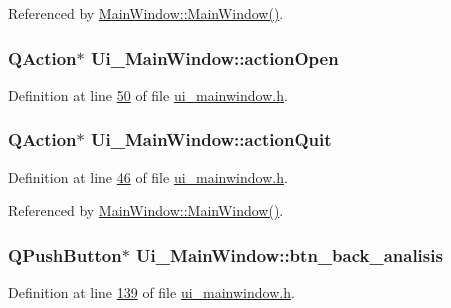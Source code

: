 Referenced by \hyperlink{a00038_source_l00024}{Main\+Window\+::\+Main\+Window()}.

\hypertarget{a00027_a5772f39001f62b7f601aafe72caa10c0}{
\subsubsection[{action\+Open}]{\setlength{\rightskip}{0pt plus 5cm}Q\+Action$\ast$ Ui\+\_\+\+Main\+Window\+::action\+Open}}\label{a00027_a5772f39001f62b7f601aafe72caa10c0}


Definition at line \hyperlink{a00052_source_l00050}{50} of file \hyperlink{a00052_source}{ui\+\_\+mainwindow.\+h}.

\hypertarget{a00027_a188c243f36a2dbc10e4e2a0ad94273b1}{
\subsubsection[{action\+Quit}]{\setlength{\rightskip}{0pt plus 5cm}Q\+Action$\ast$ Ui\+\_\+\+Main\+Window\+::action\+Quit}}\label{a00027_a188c243f36a2dbc10e4e2a0ad94273b1}


Definition at line \hyperlink{a00052_source_l00046}{46} of file \hyperlink{a00052_source}{ui\+\_\+mainwindow.\+h}.



Referenced by \hyperlink{a00038_source_l00024}{Main\+Window\+::\+Main\+Window()}.

\hypertarget{a00027_a5704296b847187d5975858d04c8c2513}{
\subsubsection[{btn\+\_\+back\+\_\+analisis}]{\setlength{\rightskip}{0pt plus 5cm}Q\+Push\+Button$\ast$ Ui\+\_\+\+Main\+Window\+::btn\+\_\+back\+\_\+analisis}}\label{a00027_a5704296b847187d5975858d04c8c2513}


Definition at line \hyperlink{a00052_source_l00139}{139} of file \hyperlink{a00052_source}{ui\+\_\+mainwindow.\+h}.


